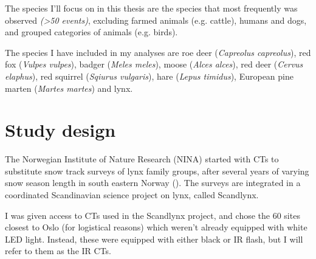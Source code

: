 
The species I'll focus on in this thesis are the species that most frequently was observed \emph{(>50 events)}, excluding farmed animals (e.g. cattle), humans and dogs, and grouped categories of animals (e.g. birds).




The species I have included in my analyses are roe deer (\textit{Capreolus capreolus}), red fox (\textit{Vulpes vulpes}), badger (\textit{Meles meles}), moose (\textit{Alces alces}), red deer (\textit{Cervus elaphus}), red squirrel (\textit{Sqiurus vulgaris}), hare (\textit{Lepus timidus}), European pine marten (\textit{Martes martes}) and lynx. 




\section{Study design} 
The Norwegian Institute of Nature Research (NINA) started with CTs to substitute snow track surveys of lynx family groups, after several years of varying snow season length in south eastern Norway (\cite{Odden2015}). The surveys are integrated in a coordinated Scandinavian science project on lynx, called Scandlynx. 

I was given access to CTs used in the Scandlynx project, and chose the 60 %
sites closest to Oslo (for logistical reasons) which weren't already equipped with white LED light. 
Instead, these were equipped with either black or IR flash, but I will refer to them as the IR CTs. 

